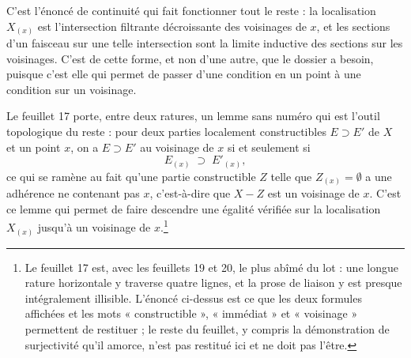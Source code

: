 \documentclass[11pt,a4paper]{article}
\begin{document}
C'est l'énoncé de continuité qui fait fonctionner tout le reste : la
localisation $X_{(x)}$ est l'intersection filtrante décroissante des voisinages
de $x$, et les sections d'un faisceau sur une telle intersection sont la limite
inductive des sections sur les voisinages. C'est de cette forme, et non d'une
autre, que le dossier a besoin, puisque c'est elle qui permet de passer d'une
condition en un point à une condition sur un voisinage.

Le feuillet 17 porte, entre deux ratures, un lemme sans numéro qui est l'outil
topologique du reste : pour deux parties localement constructibles $E \supset
E'$ de $X$ et un point $x$, on a $E \supset E'$ au voisinage de $x$ si et
seulement si
\[
  E_{(x)} \;\supset\; E'_{(x)} ,
\]
ce qui se ramène au fait qu'une partie constructible $Z$ telle que
$Z_{(x)} = \emptyset$ a une adhérence ne contenant pas $x$, c'est-à-dire que
$X - Z$ est un voisinage de $x$. C'est ce lemme qui permet de faire descendre
une égalité vérifiée sur la localisation $X_{(x)}$ jusqu'à un voisinage de
$x$.\footnote{Le feuillet 17 est, avec les feuillets 19 et 20, le plus abîmé du
lot : une longue rature horizontale y traverse quatre lignes, et la prose de
liaison y est presque intégralement illisible. L'énoncé ci-dessus est ce que les
deux formules affichées et les mots « constructible », « immédiat » et
« voisinage » permettent de restituer ; le reste du feuillet, y compris la
démonstration de surjectivité qu'il amorce, n'est pas restitué ici et ne doit
pas l'être.}
\end{document}

